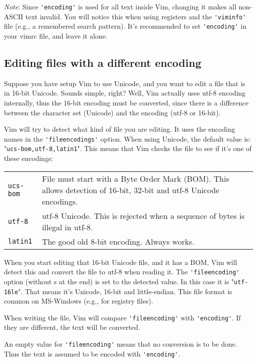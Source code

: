 \emph{Note}:
Since \verb!'encoding'! is used for all text inside Vim, changing it makes all non-ASCII text invalid.
You will notice this when using registers and the \verb!'viminfo'! file (e.g., a remembered search pattern).
It's recommended to set \verb!'encoding'! in your vimrc file, and leave it alone.
\subsection{Editing files with a different encoding}
Suppose you have setup Vim to use Unicode, and you want to edit a file that is in 16-bit Unicode.
Sounds simple, right?  Well, Vim actually uses utf-8 encoding internally, thus the 16-bit encoding must be converted, since there is a difference between the character set (Unicode) and the encoding (utf-8 or 16-bit).

Vim will try to detect what kind of file you are editing.
It uses the encoding names in the \verb!'fileencodings'! option.
When using Unicode, the default value is: "\verb!ucs-bom,utf-8,latin1!".
This means that Vim checks the file to see if it's one of these encodings:

\begin{center} \begin{tabularx}{\textwidth}{l X}
				\texttt{ucs-bom} & File must start with a Byte Order Mark (BOM).  This allows detection of 16-bit, 32-bit and utf-8 Unicode encodings. \\
				\texttt{utf-8} & utf-8 Unicode.  This is rejected when a sequence of bytes is illegal in utf-8. \\
				\texttt{latin1} & The good old 8-bit encoding.  Always works. \\
\end{tabularx} \end{center}
When you start editing that 16-bit Unicode file, and it has a BOM, Vim will detect this and convert the file to utf-8 when reading it.
The \verb!'fileencoding'! option (without s at the end) is set to the detected value.
In this case it is "\verb!utf-16le!".
That means it's Unicode, 16-bit and little-endian.
This file format is common on MS-Windows (e.g., for registry files).

When writing the file, Vim will compare \verb!'fileencoding'! with \verb!'encoding'!.
If they are different, the text will be converted.

An empty value for \verb!'fileencoding'! means that no conversion is to be done.
Thus the text is assumed to be encoded with \verb!'encoding'!.

